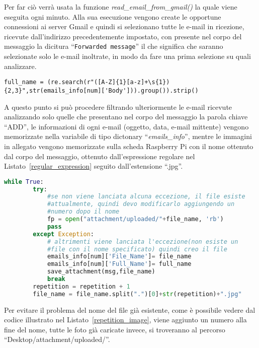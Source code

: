 Per far ciò verrà usata la funzione \textit{read\_email\_from\_gmail()} la quale viene eseguita ogni minuto. Alla sua esecuzione vengono create le opportune 
connessioni ai server Gmail e quindi si selezionano tutte le e-mail in ricezione, ricevute dall'indirizzo precedentemente impostato, con presente nel corpo del 
messaggio la dicitura ``\texttt{Forwarded message}'' il che significa che saranno selezionate solo le e-mail inoltrate, in modo da fare una prima selezione su quali analizzare.
\begin{lstlisting}[caption=Espressione regolare,captionpos=t,label=regular_expression]
full_name = (re.search(r"([A-Z]{1}[a-z]+\s{1}){2,3}",str(emails_info[num]['Body'])).group()).strip()
\end{lstlisting}
A questo punto si può procedere filtrando ulteriormente le e-mail ricevute analizzando solo quelle che presentano nel corpo del messaggio la parola chiave ``ADD'',
le informazioni di ogni e-mail (oggetto, data, e-mail mittente) vengono memorizzate nella variabile di tipo dictonary ``\textit{emails\_info}'', mentre le immagini in allegato 
vengono memorizzate sulla scheda Raspberry Pi con il nome ottenuto dal corpo del messaggio, ottenuto dall'espressione regolare nel Listato~\ref{regular_expression}
seguito dall'estensione ``.jpg''.
\begin{lstlisting}[language=Python,frame=single,caption=Codice che gestisce la ripetizione dei nomi,captionpos=t,label=repetition_image]
    while True:
        try:
            #se non viene lanciata alcuna eccezione, il file esiste 
            #attualmente, quindi devo modificarlo aggiungendo un 
            #numero dopo il nome
            fp = open("attachment/uploaded/"+file_name, 'rb')
            pass
        except Exception:
            # altrimenti viene lanciata l'eccezione(non esiste un 
            #file con il nome specificato) quindi creo il file
            emails_info[num]['File_Name']= file_name
            emails_info[num]['Full_Name']= full_name
            save_attachment(msg,file_name)
            break
        repetition = repetition + 1 
        file_name = file_name.split(".")[0]+str(repetition)+".jpg"
\end{lstlisting}
Per evitare il problema del nome del file già esistente, come è possibile vedere dal codice illustrato nel Listato~\ref{repetition_image}, viene aggiunto un numero 
alla fine del nome, tutte le foto già caricate invece, si troveranno al percorso ``Desktop/attachment/uploaded/''.


